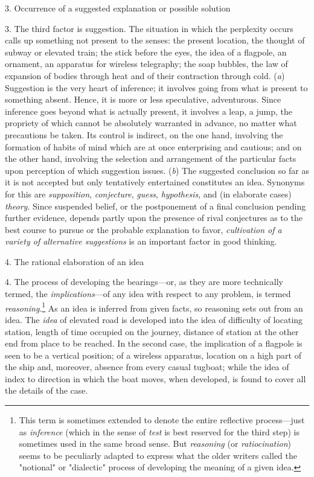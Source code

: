 \documentclass[letterpaper]{book}
\begin{document}
3. Occurrence of a suggested explanation or possible solution

3. The third factor is suggestion. The situation
in
which the perplexity occurs calls up something not present to the
senses: the present location, the thought of subway or elevated train;
the stick before the eyes, the idea of a flagpole, an ornament, an
apparatus for wireless telegraphy; the soap bubbles, the law of
expansion of bodies through heat and of their contraction through cold.
(\emph{a}) Suggestion is the very heart of inference; it involves going
from what is present to something absent. Hence, it is more or less
speculative, adventurous. Since inference goes beyond what is actually
present, it involves a leap, a jump, the propriety of which cannot be
absolutely warranted in advance, no matter what precautions be taken.
Its control is indirect, on the one hand, involving the formation of
habits of mind which are at once enterprising and cautious; and on the
other hand, involving the selection and arrangement of the particular
facts upon perception of which suggestion issues. (\emph{b}) The
suggested conclusion so far as it is not accepted but only tentatively
entertained constitutes an idea. Synonyms for this are
\emph{supposition}, \emph{conjecture}, \emph{guess}, \emph{hypothesis},
and (in elaborate cases) \emph{theory}. Since suspended belief, or the
postponement of a final conclusion pending further evidence, depends
partly upon the presence of rival conjectures as to the best course to
pursue or the probable explanation to favor, \emph{cultivation of a
variety of alternative suggestions} is an important factor in good
thinking.

4. The rational elaboration of an idea

4. The process of developing the bearings---or, as they are more
technically termed, the \emph{implications}---of any idea with respect
to any problem, is termed
\emph{reasoning}.\footnote{
This term is sometimes extended to denote the entire reflective
process---just as \emph{inference} (which in the sense of \emph{test} is
best reserved for the third step) is sometimes used in the same broad
sense. But \emph{reasoning} (or \emph{ratiocination}) seems to be
peculiarly adapted to express what the older writers called the
"notional" or "dialectic" process of developing the meaning of a given
idea.
}
As an idea is inferred from given facts, so
reasoning
sets out from an idea. The \emph{idea} of elevated road is developed
into the idea of difficulty of locating station, length of time occupied
on the journey, distance of station at the other end from place to be
reached. In the second case, the implication of a flagpole is seen to be
a vertical position; of a wireless apparatus, location on a high part of
the ship and, moreover, absence from every casual tugboat; while the
idea of index to direction in which the boat moves, when developed, is
found to cover all the details of the case.
\end{document}
